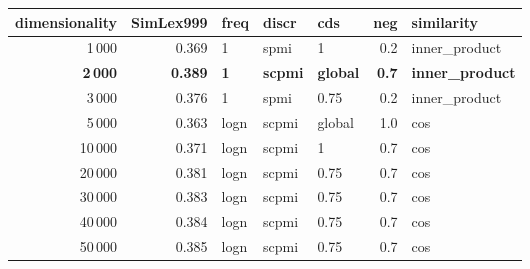 \begin{tabular}{rrlllrl}
\toprule
 dimensionality &  SimLex999 &  freq &  discr &     cds &  neg &     similarity \\
\midrule
           1\,000 &      0.369 &     1 &   spmi &       1 &  0.2 &  inner\_product \\
           \textbf{2\,000} &      \textbf{0.389} &     \textbf{1} &  \textbf{scpmi} &  \textbf{global} &  \textbf{0.7} &  \textbf{inner\_product} \\
           3\,000 &      0.376 &     1 &   spmi &    0.75 &  0.2 &  inner\_product \\
           5\,000 &      0.363 &  logn &  scpmi &  global &  1.0 &            cos \\
          10\,000 &      0.371 &  logn &  scpmi &       1 &  0.7 &            cos \\
          20\,000 &      0.381 &  logn &  scpmi &    0.75 &  0.7 &            cos \\
          30\,000 &      0.383 &  logn &  scpmi &    0.75 &  0.7 &            cos \\
          40\,000 &      0.384 &  logn &  scpmi &    0.75 &  0.7 &            cos \\
          50\,000 &      0.385 &  logn &  scpmi &    0.75 &  0.7 &            cos \\
\bottomrule
\end{tabular}

